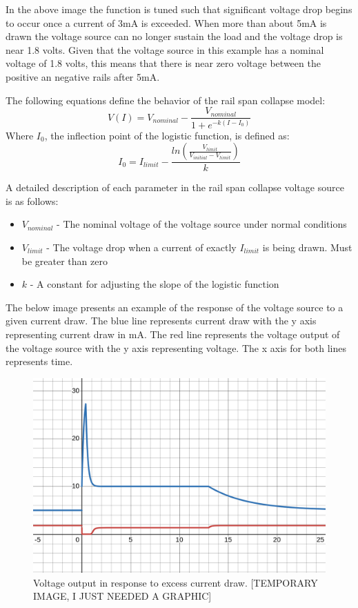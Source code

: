 \documentclass[conference]{IEEEtran}
\begin{document}
In the above image the function is tuned such that significant voltage drop begins to occur once a current of 3mA is exceeded. When more than about 5mA is drawn the voltage source can no longer sustain the load and the voltage drop is near 1.8 volts. Given that the voltage source in this example has a nominal voltage of 1.8 volts, this means that there is near zero voltage between the positive an negative rails after 5mA.

The following equations define the behavior of the rail span collapse model:
{\Large
\[V(I)=V_{nominal}-\frac{V_{nominal}}{1+e^{-k(I-I_0)}}\]
}
Where \(I_0\), the inflection point of the logistic function, is defined as:
{\Large
\[I_0=I_{limit}-\frac{ln(\frac{V_{limit}}{V_{initial}-V_{limit}})}{k}\]
}

A detailed description of each parameter in the rail span collapse voltage source is as follows:

\begin{itemize}

\item[] \(V_{nominal}\) - The nominal voltage of the voltage source under normal conditions

\item[] \(V_{limit}\) - The voltage drop when a current of exactly \(I_{limit}\) is being drawn. Must be greater than zero

\item[] \(k\) - A constant for adjusting the slope of the logistic function

\end{itemize}

The below image presents an example of the response of the voltage source to a given current draw. The blue line represents current draw with the y axis representing current draw in mA. The red line represents the voltage output of the voltage source with the y axis representing voltage. The x axis for both lines represents time.

\begin{figure}[H]
\centering
\includegraphics[width=0.9\linewidth]{Voltage_Collapse_Response.png}
\caption{Voltage output in response to excess current draw. [TEMPORARY IMAGE, I JUST NEEDED A GRAPHIC]}
\label{fig:rail_collapse_response}
\end{figure}
\end{document}
